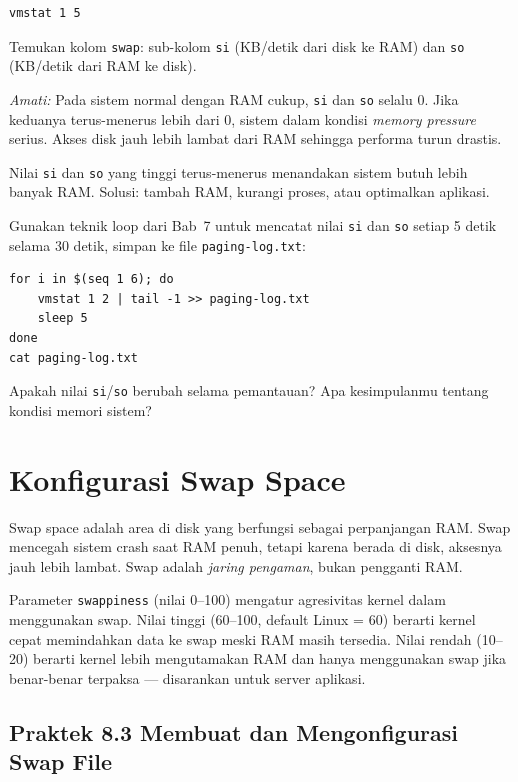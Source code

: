 \begin{lstlisting}[caption={Statistik Virtual Memory}]
vmstat 1 5
\end{lstlisting}

Temukan kolom \texttt{swap}: sub-kolom \texttt{si} (KB/detik dari disk ke RAM) dan
\texttt{so} (KB/detik dari RAM ke disk).

\textit{Amati:} Pada sistem normal dengan RAM cukup, \texttt{si} dan \texttt{so}
selalu 0. Jika keduanya terus-menerus lebih dari 0, sistem dalam kondisi
\textit{memory pressure} serius. Akses disk jauh lebih lambat dari RAM sehingga
performa turun drastis.

\begin{warningbox}
Nilai \texttt{si} dan \texttt{so} yang tinggi terus-menerus menandakan sistem butuh
lebih banyak RAM. Solusi: tambah RAM, kurangi proses, atau optimalkan aplikasi.
\end{warningbox}

\begin{challengebox}
Gunakan teknik loop dari Bab~7 untuk mencatat nilai \texttt{si} dan \texttt{so}
setiap 5 detik selama 30 detik, simpan ke file \texttt{paging-log.txt}:
\begin{lstlisting}
for i in $(seq 1 6); do
    vmstat 1 2 | tail -1 >> paging-log.txt
    sleep 5
done
cat paging-log.txt
\end{lstlisting}
Apakah nilai \texttt{si}/\texttt{so} berubah selama pemantauan? Apa kesimpulanmu
tentang kondisi memori sistem?
\end{challengebox}

\section{Konfigurasi Swap Space}

Swap space adalah area di disk yang berfungsi sebagai perpanjangan RAM. Swap mencegah
sistem crash saat RAM penuh, tetapi karena berada di disk, aksesnya jauh lebih lambat.
Swap adalah \textit{jaring pengaman}, bukan pengganti RAM.

Parameter \texttt{swappiness} (nilai 0--100) mengatur agresivitas kernel dalam
menggunakan swap. Nilai tinggi (60--100, default Linux = 60) berarti kernel cepat
memindahkan data ke swap meski RAM masih tersedia. Nilai rendah (10--20) berarti
kernel lebih mengutamakan RAM dan hanya menggunakan swap jika benar-benar terpaksa
--- disarankan untuk server aplikasi.

\subsection*{Praktek 8.3 Membuat dan Mengonfigurasi Swap File}

